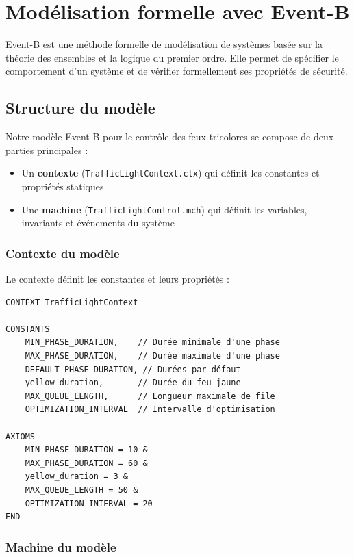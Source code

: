 \documentclass[11pt,a4paper]{article}
\begin{document}
\section{Modélisation formelle avec Event-B}
\label{sec:eventb}

Event-B est une méthode formelle de modélisation de systèmes basée sur la théorie des ensembles et la logique du premier ordre. Elle permet de spécifier le comportement d'un système et de vérifier formellement ses propriétés de sécurité.

\subsection{Structure du modèle}
\label{subsec:modele}

Notre modèle Event-B pour le contrôle des feux tricolores se compose de deux parties principales :
\begin{itemize}
    \item Un \textbf{contexte} (\texttt{TrafficLightContext.ctx}) qui définit les constantes et propriétés statiques
    \item Une \textbf{machine} (\texttt{TrafficLightControl.mch}) qui définit les variables, invariants et événements du système
\end{itemize}

\subsubsection{Contexte du modèle}
\label{subsubsec:contexte}

Le contexte définit les constantes et leurs propriétés :

\begin{lstlisting}[style=EventB, caption=Extrait du contexte Event-B]
CONTEXT TrafficLightContext

CONSTANTS
    MIN_PHASE_DURATION,    // Durée minimale d'une phase
    MAX_PHASE_DURATION,    // Durée maximale d'une phase
    DEFAULT_PHASE_DURATION, // Durées par défaut
    yellow_duration,       // Durée du feu jaune
    MAX_QUEUE_LENGTH,      // Longueur maximale de file
    OPTIMIZATION_INTERVAL  // Intervalle d'optimisation

AXIOMS
    MIN_PHASE_DURATION = 10 &
    MAX_PHASE_DURATION = 60 &
    yellow_duration = 3 &
    MAX_QUEUE_LENGTH = 50 &
    OPTIMIZATION_INTERVAL = 20
END
\end{lstlisting}
\subsubsection{Machine du modèle}
\label{subsubsec:machine}
\end{document}
